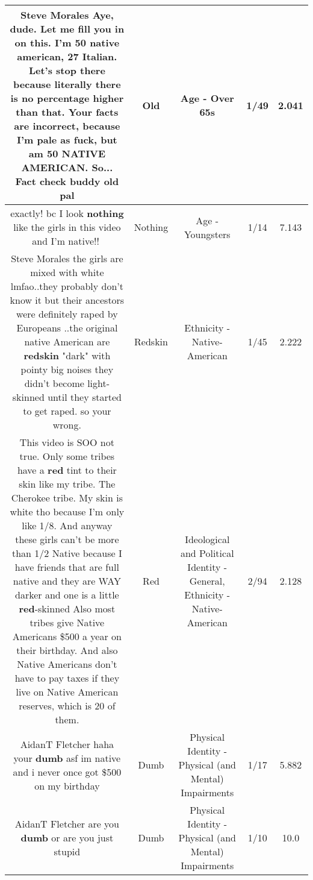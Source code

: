 \documentclass[11pt]{article}
\newlength\mylength
\begin{document}
\begin{center}
\begin{longtable}{|C{.65\mylength}|C{.30\mylength}|C{.12\mylength}|C{.12\mylength}|C{.12\mylength}|}
  \small Steve Morales Aye, dude. Let me fill you in on this. I'm 50 native american, 27 Italian. Let's stop there because literally there is no percentage higher than that. Your facts are incorrect, because I'm pale as fuck, but am 50 NATIVE AMERICAN. So... Fact check buddy \textbf{old} pal\normalsize   & Old & Age - Over 65s & 1/49 & 2.041 \\  \hline
  \small exactly! bc I look \textbf{nothing} like the girls in this video and I'm native!!😬\normalsize   & Nothing & Age - Youngsters & 1/14 & 7.143 \\  \hline
  \small Steve Morales the girls are mixed with white lmfao..they probably don't know it but their ancestors were definitely raped by Europeans ..the original native American are \textbf{redskin} "dark" with pointy big noises they didn't become light-skinned until they started to get raped. so your wrong.\normalsize   & Redskin & Ethnicity - Native-American & 1/45 & 2.222 \\  \hline
  \small This video is SOO not true. Only some tribes have a \textbf{r\textbf{ed}} tint to their skin like my tribe. The Cherokee tribe. My skin is white tho because I'm only like 1/8. And anyway these girls can't be more than 1/2 Native because I have friends that are full native and they are WAY darker and one is a little \textbf{r\textbf{ed}}-skinned Also most tribes give Native Americans \$500 a year on their birthday. And also Native Americans don't have to pay taxes if they live on Native American reserves, which is 20 of them.\normalsize   & Red &  Ideological and Political Identity - General, Ethnicity - Native-American & 2/94 & 2.128 \\  \hline
  \small AidanT Fletcher haha your \textbf{dumb} asf im native and i never once got \$500 on my birthday\normalsize   & Dumb & Physical Identity - Physical (and Mental) Impairments & 1/17 & 5.882 \\  \hline
  \small AidanT Fletcher are you \textbf{dumb} or are you just stupid\normalsize   & Dumb & Physical Identity - Physical (and Mental) Impairments & 1/10 & 10.0 \\  \hline

\end{longtable}
\end{center}
\end{document}
